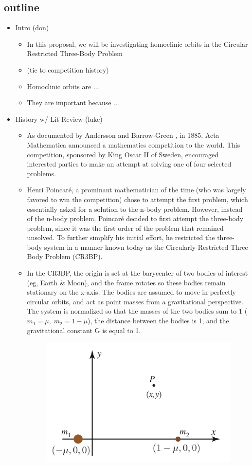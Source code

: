 \documentclass{article}
\begin{document}
\subsection{outline}
\begin{itemize}
	\item Intro (don)
	  \begin{itemize}
	  	\item In this proposal, we will be investigating homoclinic orbits in the Circular Restricted Three-Body Problem
	  	\item (tie to competition history)
	  	\item Homoclinic orbits are ... 
	  	\item They are important because ...
	  \end{itemize}
	\item History w/ Lit Review (luke)
	  \begin{itemize}
	  	\item As documented by Andersson and Barrow-Green \cite{Andersson1994,BarrowGreen1994}, in 1885, Acta Mathematica announced a mathematics competition to the world. This competition, sponsored by King Oscar II of Sweden, encouraged interested parties to make an attempt at solving one of four selected problems.
	  	\item Henri Poincaré, a prominant mathematician of the time (who was largely favored to win the competition) chose to attempt the first problem, which essentially asked for a solution to the n-body problem. However, instead of the n-body problem, Poincaré decided to first attempt the three-body problem, since it was the first order of the problem that remained unsolved. To further simplify his initial effort, he restricted the three-body system in a manner known today as the Circularly Restricted Three Body Problem (CR3BP). 
	  	\item In the CR3BP, the origin is set at the barycenter of two bodies of interest (eg, Earth \& Moon), and the frame rotates so these bodies remain stationary on the x-axis. The bodies are assumed to move in perfectly circular orbits, and act as point masses from a gravitational perspective. The system is normalized so that the masses of the two bodies sum to 1 ($m_1 = \mu,\; m_2 = 1-\mu$), the distance between the bodies is 1, and the gravitational constant G is equal to 1. 
	  	\begin{figure}
	  	\centering
	  	\includegraphics[scale=0.6]{CR3BP.png}\nonumber

\end{figure}
\end{itemize}
\end{itemize}
\end{document}
